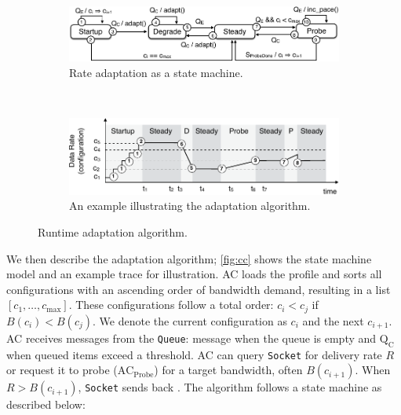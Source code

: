 \begin{figure}
  \begin{subfigure}[t]{\columnwidth}
    \centering
    \includegraphics[width=\columnwidth]{figures/cc.pdf}
    \caption{Rate adaptation as a state machine.}
    \vspace{1em}
    \label{fig:cc-sm}
  \end{subfigure}
  \\
  \centering
  \begin{subfigure}[t]{0.9\columnwidth}
    \centering
    \includegraphics[width=\columnwidth]{figures/cc2.pdf}
    \caption{An example illustrating the adaptation algorithm.}
    \label{fig:cc-ex}
  \end{subfigure}
  \caption{Runtime adaptation algorithm.}
  \label{fig:cc}
\end{figure}

We then describe the adaptation algorithm; \autoref{fig:cc} shows the state
machine model and an example trace for illustration.  AC loads the profile and
sorts all configurations with an ascending order of bandwidth demand, resulting
in a list $[c_1, \dots, c_{\max}]$.  These configurations follow a total order:
$c_i < c_j$ if $B(c_i) < B(c_j)$.  We denote the current configuration as $c_i$
and the next $c_{i+1}$.  AC receives messages from the \texttt{Queue}: message
\qe{} when the queue is empty and $\text{Q}_\text{C}$ when queued items exceed a
threshold. AC can query \texttt{Socket} for delivery rate $R$ or request it to
probe ($\text{AC}_{\text{Probe}}$) for a target bandwidth, often
$B(c_{i+1})$. When $R > B(c_{i+1})$, \texttt{Socket} sends back \spd{}. The
algorithm follows a state machine as described below:

